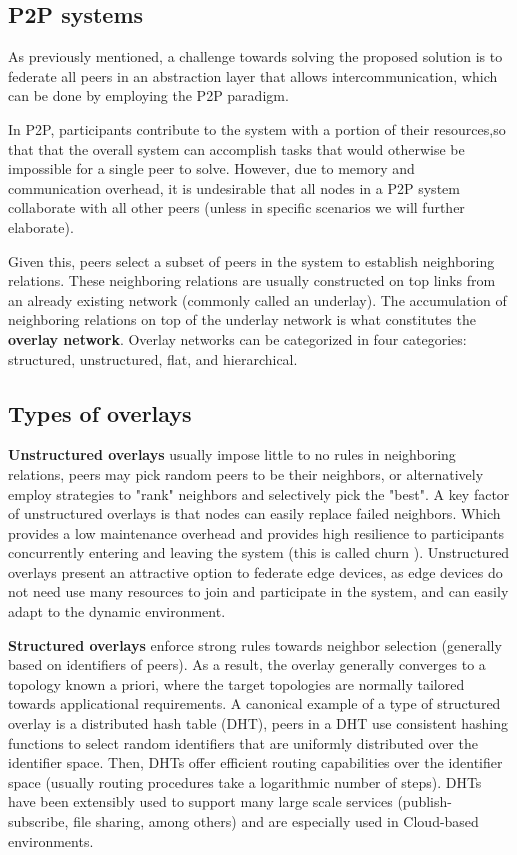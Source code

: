 
\subsection{P2P systems}

As previously mentioned, a challenge towards solving the proposed solution is to federate all peers in an abstraction layer that allows intercommunication, which can be done by employing the P2P paradigm.

In P2P, participants contribute to the system with a portion of their resources,so that that the overall system can accomplish tasks that would otherwise be impossible for a single peer to solve. However, due to memory and communication overhead, it is undesirable that all nodes in a P2P system collaborate with all other peers (unless in specific scenarios we will further elaborate). 

Given this, peers select a subset of peers in the system to establish neighboring relations. These neighboring relations are usually constructed on top links from an already existing network (commonly called an underlay). The accumulation of neighboring relations on top of the underlay network is what constitutes the \textbf{overlay network}. Overlay networks can be categorized in four categories: structured, unstructured, flat, and hierarchical.  


\subsection{Types of overlays} 

\textbf{Unstructured overlays} usually impose little to no rules in neighboring relations, peers may pick random peers to be their neighbors, or alternatively employ strategies to "rank" neighbors and selectively pick the "best". A key factor of unstructured overlays is that nodes can easily replace failed neighbors. Which provides a low maintenance overhead and provides high resilience to participants concurrently entering and leaving the system (this is called churn \cite{stutzbach2006understanding}). Unstructured overlays present an attractive option to federate edge devices, as edge devices do not need use many resources to join and participate in the system, and can easily adapt to the dynamic environment.

\textbf{Structured overlays} enforce strong rules towards neighbor selection (generally based on identifiers of peers). As a result, the overlay generally converges to a topology known a priori, where the target topologies are normally tailored towards applicational requirements. A canonical example of a type of structured overlay is a distributed hash table (DHT), peers in a DHT use consistent hashing functions to select random identifiers that are uniformly distributed over the identifier space. Then, DHTs offer efficient routing capabilities over the identifier space (usually routing procedures take a logarithmic number of steps). DHTs have been extensibly used to support many large scale services (publish-subscribe, file sharing, among others) and are especially used in Cloud-based environments.

